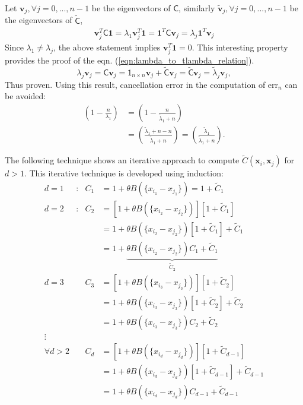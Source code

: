\documentclass[smallextended]{svjour3}       %
\newcommand{\bm}[1]{\boldsymbol{#1}}
\newcommand{\vv}{\bm{v}}
\newcommand{\vx}{\bm{x}}
\newcommand{\tvv}{\tilde{\vv}}
\newcommand{\vone}{\bm{1}}
\newcommand{\mC}{\mathsf{C}}
\newcommand{\tmC}{\widetilde{\mathsf{C}}}
\newcommand{\tlambda}{\tilde{\lambda}}
\newcommand{\errn}{\text{err}_{n}}
\begin{document}
Let $\vv_j, \forall j=0,...,n-1$ be the eigenvectors of $\mC$, similarly
 $\tvv_j, \forall j=0,...,n-1$ be the eigenvectors of $\tmC$,
\begin{align*}
\vv_j^T \mC \vone = \lambda_1 \vv_j^T \vone
 = \vone^T \mC \vv_j
 = \lambda_j \vone^T  \vv_j
 \end{align*}
Since $\lambda_1 \neq \lambda_j$, the above statement implies $\vv_j^T \vone = 0$. This interesting property provides the proof of the eqn. (\ref{eqn:lambda_to_tlambda_relation}).
\[
\lambda_j \vv_j = \mC \vv_j = \mathsf{1}_{n \times n} \vv_j + \tmC \vv_j 
= \tmC \vv_j = \tlambda_j \vv_j ,
\]
Thus proven. 
Using this result, 
cancellation error in the computation of $\errn$ can be avoided:
\begin{align*}
\left( 1 - \frac{n }{\lambda_1} \right) 
& = \left( 1 - \frac{n }{\tlambda_1 + n} \right)
\\
& = \left( \frac{\tlambda_1 + n - n }{\tlambda_1 + n} \right)
 = \left( \frac{\tlambda_1 }{\tlambda_1 + n} \right).
\end{align*}


The following technique shows an iterative approach to compute $\tilde{C}(\vx_i,\vx_j)$ for $d > 1$. This iterative technique is developed using induction:
\begin{align*}
d=1 &:& C_1 &= 1 + \theta B(\{x_{i_1} - x_{j_1}\}) = 1 + \tilde{C}_1
\\
d=2 &:& C_2 &= [1 + \theta B(\{x_{i_2} - x_{j_2}\})] [1 + \tilde{C}_1]
\\
    &&      &= 1 +  \theta B(\{x_{i_2} - x_{j_2}\}) [1 + \tilde{C}_1]  +  \tilde{C}_1 
\\
    &&      &= 1 +  \underbrace{\theta B(\{x_{i_2} - x_{j_2}\}) C_1  +  \tilde{C}_1 }_{\tilde{C}_2}
\\
d=3 &&  C_3 &= [1 +  \theta B(\{x_{i_3} - x_{j_3}\})][ 1 + \tilde{C}_2] 
\\
    &&      &= 1 +  \theta B(\{x_{i_3} - x_{j_3}\})[1 + \tilde{C}_2] + \tilde{C}_2
\\
    &&      &= 1 +  \theta B(\{x_{i_3} - x_{j_3}\})C_2 + \tilde{C}_2
\\
\vdots
\\
\forall d>2 && C_d &= [1 +  \theta B(\{x_{i_d} - x_{j_d}\})][ 1 + \tilde{C}_{d-1}] 
\\
&& &= 1 +  \theta B(\{x_{i_d} - x_{j_d}\})[ 1 + \tilde{C}_{d-1}] + \tilde{C}_{d-1}
\\
&& &= 1 +  \theta B(\{x_{i_d} - x_{j_d}\})C_{d-1} + \tilde{C}_{d-1}
\end{align*}
\end{document}
